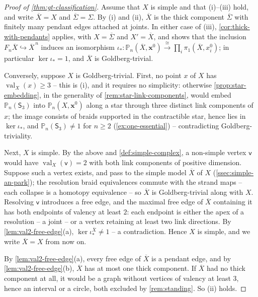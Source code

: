 \documentclass[reqno]{amsart}
\theoremstyle{definition}
\newcommand\bfx{\mathbf{x}}
\newcommand\sfS{\mathsf{S}}
\newcommand\sfv{\mathsf{v}}
\newcommand{\PB}{\mathbb{P}}
\newcommand{\base}{\bfx^0}
\renewcommand{\bar}{\overline}
\DeclareMathOperator{\val}{val}
\numberwithin{equation}{section}
\begin{document}
\begin{proof}[Proof of \cref{thm:gt-classification}]
Assume that \(X\) is simple and that
(i)--(iii) hold, and write \(\bar X=X\) and
\(\bar\Sigma=\Sigma\). By (i) and (ii), \(\bar X\) is the thick
component \(\bar\Sigma\) with finitely many pendant edges
attached at joints. In either case of (iii), \cref{cor:thick-with-pendants}
applies, with \(X=\bar\Sigma\) and \(X'=\bar X\), and shows that
the inclusion \(F_n\bar X\hookrightarrow\bar X^{\,n}\) induces
an isomorphism
\(\iota_\ast\colon\PB_n(\bar X,\base)\xrightarrow{\cong}
\prod_{i}\pi_1(\bar X,x^0_i)\); in particular
\(\ker\iota_\ast=1\), and \(\bar X\) is Goldberg-trivial.

Conversely, suppose \(X\) is Goldberg-trivial.
First, no point \(x\) of \(X\) has \(\val_{X}(x)\geq3\) -- this
is (i), and it requires no simplicity: otherwise
\cref{prop:star-embedding}, in the generality of
\cref{rem:star-link-components}, would embed \(\PB_n(\sfS_3)\)
into \(\PB_n(X,\base)\) along a star through three distinct
link components of \(x\); the image consists of braids supported
in the contractible star, hence lies in \(\ker\iota_\ast\), and
\(\PB_n(\sfS_3)\neq1\) for \(n\geq2\)
(\cref{ex:one-essential}) -- contradicting Goldberg-triviality.

Next, \(X\) is simple. By the above and
\cref{def:simple-complex}, a non-simple vertex \(\sfv\) would have
\(\val_X(\sfv)=2\) with both link components of positive dimension.
Suppose such a vertex exists, and pass to the simple model
\(\bar X\) of \(X\) (\cref{ssec:simple-an-park}); the resolution
braid equivalences commute with the strand maps -- each collapse
is a homotopy equivalence -- so \(\bar X\) is Goldberg-trivial
along with \(X\). Resolving \(\sfv\) introduces a free edge, and
the maximal free edge of \(\bar X\) containing it has both
endpoints of valency at least \(2\): each endpoint is either the
apex of a resolution -- a joint -- or a vertex retaining at
least two link directions. By \cref{lem:val2-free-edge}(a),
\(\ker\iota_\ast^{\bar X}\neq1\) -- a contradiction. Hence
\(X\) is simple, and we write \(\bar X=X\) from now on.

By \cref{lem:val2-free-edge}(a), every free edge of \(\bar X\)
is a pendant edge, and by \cref{lem:val2-free-edge}(b),
\(\bar X\) has at most one thick component. If \(\bar X\) had no thick
component at all, it would be a graph without vertices of
valency at least \(3\), hence an interval or a circle, both
excluded by \cref{rem:standing}. So (ii) holds.


\end{proof}
\end{document}

